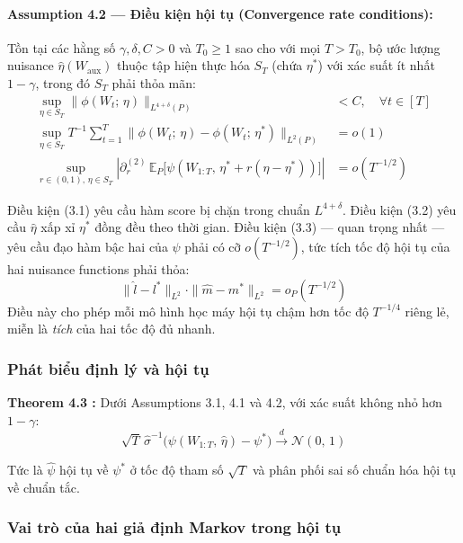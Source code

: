 \paragraph{Assumption 4.2 --- Điều kiện hội tụ (Convergence rate conditions):}
Tồn tại các hằng số \(\gamma, \delta, C > 0\) và \(T_0 \geq 1\) sao cho với mọi \(T > T_0\), bộ ước lượng nuisance \(\hat{\eta}(W_{\text{aux}})\) thuộc tập hiện thực hóa \(S_T\) (chứa \(\eta^*\)) với xác suất ít nhất \(1 - \gamma\), trong đó \(S_T\) phải thỏa mãn:
\begin{align}
    \sup_{\eta \in S_T} \|\phi(W_t;\, \eta)\|_{L^{4+\delta}(P)} &< C, \quad \forall t \in [T] \tag{3.1}\\
    \sup_{\eta \in S_T} T^{-1} \sum_{t=1}^T \|\phi(W_t;\, \eta) - \phi(W_t;\, \eta^*)\|_{L^2(P)} &= o(1) \tag{3.2}\\
    \sup_{r \in (0,1),\, \eta \in S_T} \left|\partial^{(2)}_r \,\mathbb{E}_P\bigl[\psi(W_{1:T},\, \eta^* + r(\eta - \eta^*))\bigr]\right| &= o(T^{-1/2}) \tag{3.3}
\end{align}

Điều kiện (3.1) yêu cầu hàm score bị chặn trong chuẩn \(L^{4+\delta}\). Điều kiện (3.2) yêu cầu \(\hat{\eta}\) xấp xỉ \(\eta^*\) đồng đều theo thời gian. Điều kiện (3.3) --- quan trọng nhất --- yêu cầu đạo hàm bậc hai của \(\psi\) phải có cỡ \(o(T^{-1/2})\), tức tích tốc độ hội tụ của hai nuisance functions phải thỏa:
\[
    \|\hat{l} - l^*\|_{L^2} \cdot \|\hat{m} - m^*\|_{L^2} = o_P(T^{-1/2})
\]
Điều này cho phép mỗi mô hình học máy hội tụ chậm hơn tốc độ \(T^{-1/4}\) riêng lẻ, miễn là \textit{tích} của hai tốc độ đủ nhanh.

\subsubsection{Phát biểu định lý và hội tụ}

\textbf{Theorem 4.3 \cite{hays2025double}:} Dưới Assumptions 3.1, 4.1 và 4.2, với xác suất không nhỏ hơn \(1 - \gamma\):
\[
    \sqrt{T}\, \hat{\sigma}^{-1} \bigl(\psi(W_{1:T},\, \hat{\eta}) - \psi^*\bigr) \xrightarrow{d} \mathcal{N}(0,\, 1)
\]

Tức là \(\hat{\psi}\) hội tụ về \(\psi^*\) ở tốc độ tham số \(\sqrt{T}\) và phân phối sai số chuẩn hóa hội tụ về chuẩn tắc.

\subsubsection{Vai trò của hai giả định Markov trong hội tụ}

